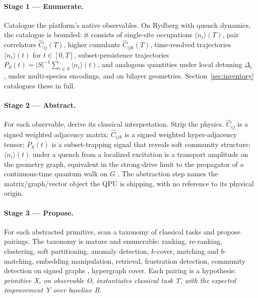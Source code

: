 \documentclass[10pt]{article}
\begin{document}
\paragraph{Stage 1 --- Enumerate.}
Catalogue the platform's native observables. On Rydberg with quench dynamics, the catalogue is bounded: it consists of single-site occupations $\langle n_i\rangle(T)$, pair correlators $\hat C_{ij}(T)$, higher cumulants $\hat C_{ijk}(T)$, time-resolved trajectories $\langle n_i\rangle(t)$ for $t \in [0, T]$, subset-persistence trajectories $P_S(t) = |S|^{-1}\sum_{i\in S}\langle n_i\rangle(t)$, and analogous quantities under local detuning $\Delta_i$, under multi-species encodings, and on bilayer geometries. Section~\ref{sec:inventory} catalogues these in full.

\paragraph{Stage 2 --- Abstract.}
For each observable, derive its classical interpretation. Strip the physics. $\hat C_{ij}$ is a signed weighted adjacency matrix; $\hat C_{ijk}$ is a signed weighted hyper-adjacency tensor; $P_S(t)$ is a subset-trapping signal that reveals soft community structure; $\langle n_i\rangle(t)$ under a quench from a localized excitation is a transport amplitude on the geometry graph, equivalent in the strong-drive limit to the propagator of a continuous-time quantum walk on $G$ \cite{farhi1998quantum}. The abstraction step names the matrix/graph/vector object the QPU is shipping, with no reference to its physical origin.

\paragraph{Stage 3 --- Propose.}
For each abstracted primitive, scan a taxonomy of classical tasks and propose pairings. The taxonomy is mature and enumerable: ranking, re-ranking, clustering, soft partitioning, anomaly detection, $k$-cover, matching and $b$-matching, embedding manipulation, retrieval, frustration detection, community detection on signed graphs \cite{tang2016signedsurvey}, hypergraph cover. Each pairing is a hypothesis: \emph{primitive X, on observable O, instantiates classical task T, with the expected improvement Y over baseline B}.
\end{document}
